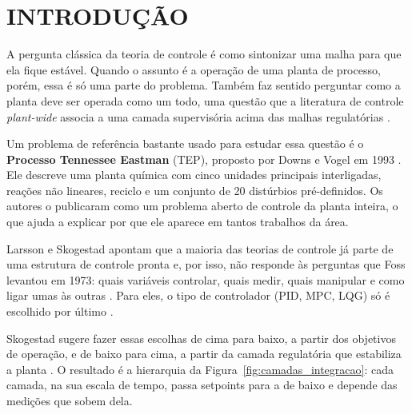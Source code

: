\chapter[INTRODUÇÃO]{INTRODUÇÃO}

A pergunta clássica da teoria de controle é como sintonizar uma malha para que ela fique estável. Quando o assunto é a operação de uma planta de processo, porém, essa é só uma parte do problema. Também faz sentido perguntar como a planta deve ser operada como um todo, uma questão que a literatura de controle \textit{plant-wide} associa a uma camada supervisória acima das malhas regulatórias \cite{Larsson2000, Skogestad2004}. 

Um problema de referência bastante usado para estudar essa questão é o \textbf{Processo Tennessee Eastman} (TEP), proposto por Downs e Vogel em 1993 \cite{DOWNS1993}. Ele descreve uma planta química com cinco unidades principais interligadas, reações não lineares, reciclo e um conjunto de 20 distúrbios pré-definidos. Os autores o publicaram como um problema aberto de controle da planta inteira, o que ajuda a explicar por que ele aparece em tantos trabalhos da área.

Larsson e Skogestad apontam que a maioria das teorias de controle já parte de uma estrutura de controle pronta e, por isso, não responde às perguntas que Foss levantou em 1973: quais variáveis controlar, quais medir, quais manipular e como ligar umas às outras \cite{Larsson2000}. Para eles, o tipo de controlador (PID, MPC, LQG) só é escolhido por último \cite{Skogestad2004}. 

Skogestad sugere fazer essas escolhas de cima para baixo, a partir dos objetivos de operação, e de baixo para cima, a partir da camada regulatória que estabiliza a planta \cite{Larsson2000, Skogestad2004}. O resultado é a hierarquia da Figura~\ref{fig:camadas_integracao}: cada camada, na sua escala de tempo, passa setpoints para a de baixo e depende das medições que sobem dela.

